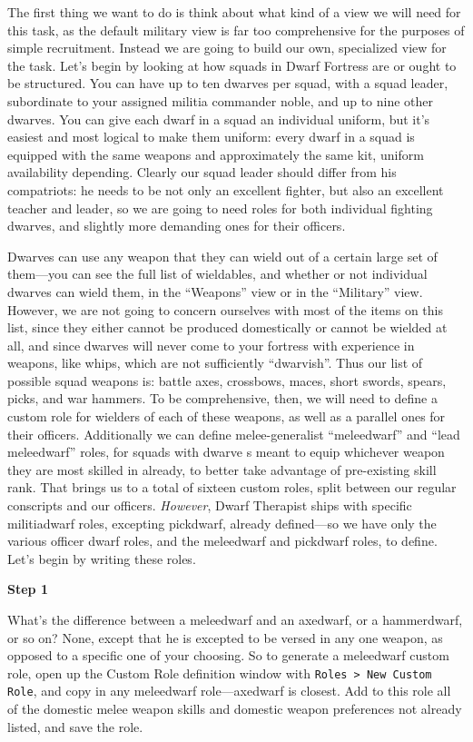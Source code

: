 \documentclass[]{article}
\newcommand{\step}[1] {
\vspace{12pt}
\noindent \textbf{Step #1}
}
\begin{document}
The first thing we want to do is think about what kind of a view we will need for this task, as the
default military view is far too comprehensive for the purposes of simple recruitment. Instead we are
going to build our own, specialized view for the task. Let's begin by looking at how squads in Dwarf
Fortress are or ought to be structured. You can have up to ten dwarves per squad, with a squad leader,
subordinate to your assigned militia commander noble, and up to nine other dwarves. You can give each
dwarf in a squad an individual uniform, but it's easiest and most logical to make them uniform: every
dwarf in a squad is equipped with the same weapons and approximately the same kit, uniform availability
depending. Clearly our squad leader should differ from his compatriots: he needs to be not only an
excellent fighter, but also an excellent teacher and leader, so we are going to need roles for both
individual fighting dwarves, and slightly more demanding ones for their officers.

Dwarves can use any weapon that they can wield out of a certain large set of them---you can see the full
list of wieldables, and whether or not individual dwarves can wield them, in the ``Weapons'' view or in
the ``Military'' view. However, we are not going to concern ourselves with most of the items on this
list, since they either cannot be produced domestically or cannot be wielded at all, and since dwarves
will never come to your fortress with experience in weapons, like whips, which are not
sufficiently ``dwarvish''. Thus our list of possible squad weapons is: battle axes, crossbows, maces,
short swords, spears, picks, and war hammers. To be comprehensive, then, we will need to define a custom
role for wielders of each of these weapons, as well as a parallel ones for their officers. Additionally
we can define melee-generalist ``meleedwarf'' and ``lead meleedwarf'' roles, for squads with dwarve s
meant to equip whichever weapon they are most skilled in already, to better take advantage of
pre-existing skill rank. That brings us to a total of sixteen custom roles, split between our regular
conscripts and our officers. \emph{However}, Dwarf Therapist ships with specific militiadwarf roles,
excepting pickdwarf, already defined---so we have only the various officer dwarf roles, and the
meleedwarf and pickdwarf roles, to define. Let's begin by writing these roles.

\step{1}
What's the difference between a meleedwarf and an axedwarf, or a hammerdwarf, or so on? None, except that
he is excepted to be versed in any one weapon, as opposed to a specific one of your choosing. So to
generate a meleedwarf custom role, open up the Custom Role definition window with \texttt{Roles > New
Custom Role}, and copy in any meleedwarf role---axedwarf is closest. Add to this role all of the
domestic melee weapon skills and domestic weapon preferences not already listed, and save the role.
\end{document}
